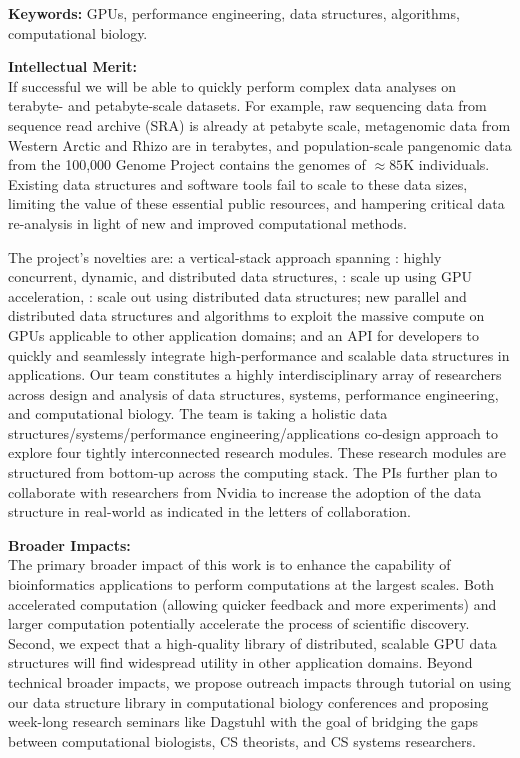 \noindent \textbf{\large Keywords:} GPUs, performance engineering, data structures, algorithms,   computational biology.

\noindent \textbf{\large Intellectual Merit:}\\
If successful we will be able to quickly perform complex data analyses on terabyte- and petabyte-scale datasets. For example, raw sequencing data from sequence read archive (SRA) is already at petabyte scale, metagenomic data from Western Arctic and Rhizo are in terabytes, and population-scale pangenomic data from the 100,000 Genome Project contains the genomes of $\approx85$K individuals. Existing data structures and software tools fail to scale to these data sizes, limiting the value of these essential public resources, and hampering critical data re-analysis in light of new and improved computational methods.

The project’s novelties are: a vertical-stack approach spanning : highly concurrent, dynamic, and distributed data structures,
: scale up using GPU acceleration, : scale out using distributed data structures; new parallel and
distributed data structures and algorithms to exploit the massive compute on
GPUs applicable to other application domains; and an API for developers to
quickly and seamlessly integrate high-performance and scalable data structures
in applications.
%
Our team constitutes a highly interdisciplinary array of researchers across design and analysis of data structures, systems, performance engineering, and computational biology. The team is taking a holistic data structures/systems/performance engineering/applications co-design approach to explore four tightly interconnected research modules. These research modules are structured from bottom-up across the computing stack. The PIs further plan to collaborate with researchers from Nvidia to increase the adoption of the data structure in real-world as indicated in the letters of collaboration.


\noindent \textbf{\large Broader Impacts: }\\
The primary broader impact of this work is to enhance the capability of
bioinformatics applications to perform computations at the largest scales. Both
accelerated computation (allowing quicker feedback and more experiments) and
larger computation potentially accelerate the process of scientific discovery.
Second, we expect that a high-quality library of distributed, scalable GPU data
structures will find widespread utility in other application domains.
%
Beyond technical broader impacts, we propose outreach impacts through tutorial
on using our data structure library in computational biology conferences and
proposing week-long research seminars like Dagstuhl with the goal of bridging
the gaps between computational biologists, CS theorists, and CS systems
researchers. 
